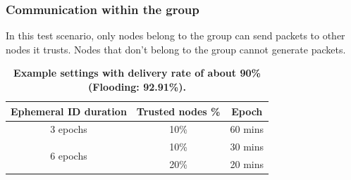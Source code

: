 \documentclass[11pt]{article}
\begin{document}
\subsubsection{Communication within the group}
In this test scenario, only nodes belong to the group can send packets to other nodes it trusts. 
Nodes that don't belong to the group cannot generate packets.


\begin{table}[!h]
\center
\begin{tabular}[!h]{|c|c|c|}
\hline
Ephemeral ID duration	& Trusted nodes \%	& Epoch	\\	
\hline
\hline
3 epochs				& 10\%				& 60 mins	\\
\hline
\multirow{2}{*}{6 epochs}	& 10\%			& 30 mins \\
							& 20\%			& 20 mins \\
\hline
\end{tabular}
\vspace{10pt}
\caption{{ \bf Example settings with delivery rate of about 90\% (Flooding: 92.91\%).}}
\label{tab:dataset_summary}
\end{table}
\end{document}

